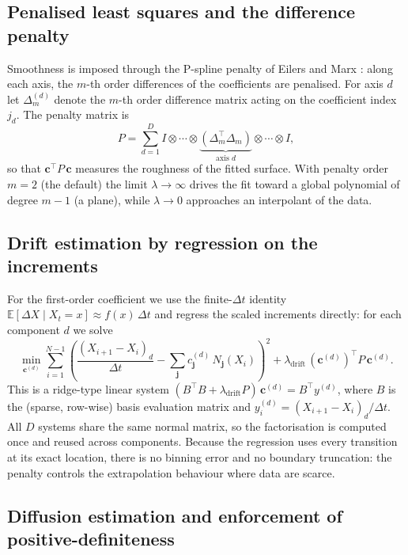 \documentclass[11pt,a4paper]{article}
\newcommand{\topT}{^{\top}}
\begin{document}
\subsection{Penalised least squares and the difference penalty}

Smoothness is imposed through the P-spline penalty of Eilers and Marx
\cite{eilers1996}: along each axis, the $m$-th order differences of the
coefficients are penalised. For axis $d$ let $\Delta_m^{(d)}$ denote the
$m$-th order difference matrix acting on the coefficient index $j_d$. The
penalty matrix is
\begin{equation}
P = \sum_{d=1}^{D} I \otimes \cdots \otimes
\underbrace{(\Delta_m\topT \Delta_m)}_{\text{axis } d} \otimes \cdots \otimes I ,
\label{eq:penalty}
\end{equation}
so that $\mathbf{c}\topT P\, \mathbf{c}$ measures the roughness of the fitted
surface. With penalty order $m = 2$ (the default) the limit $\lambda \to
\infty$ drives the fit toward a global polynomial of degree $m-1$ (a plane),
while $\lambda \to 0$ approaches an interpolant of the data.

\subsection{Drift estimation by regression on the increments}

For the first-order coefficient we use the finite-$\Delta t$ identity
$\mathbb{E}[\Delta X \mid X_t = x] \approx f(x)\,\Delta t$ and regress the
scaled increments directly: for each component $d$ we solve
\begin{equation}
\min_{\mathbf{c}^{(d)}}
\sum_{i=1}^{N-1}
\left(
\frac{(X_{i+1} - X_i)_d}{\Delta t}
- \sum_{\mathbf{j}} c^{(d)}_{\mathbf{j}}\, N_{\mathbf{j}}(X_i)
\right)^{2}
+ \lambda_{\mathrm{drift}}\, (\mathbf{c}^{(d)})\topT P\, \mathbf{c}^{(d)} .
\label{eq:drift_fit}
\end{equation}
This is a ridge-type linear system
$(B\topT B + \lambda_{\mathrm{drift}} P)\, \mathbf{c}^{(d)} = B\topT y^{(d)}$,
where $B$ is the (sparse, row-wise) basis evaluation matrix and
$y^{(d)}_i = (X_{i+1} - X_i)_d / \Delta t$. All $D$ systems share the same
normal matrix, so the factorisation is computed once and reused across
components. Because the regression uses every transition at its exact
location, there is no binning error and no boundary truncation: the penalty
controls the extrapolation behaviour where data are scarce.

\subsection{Diffusion estimation and enforcement of positive-definiteness}
\label{sec:diffusion_fit}
\end{document}
